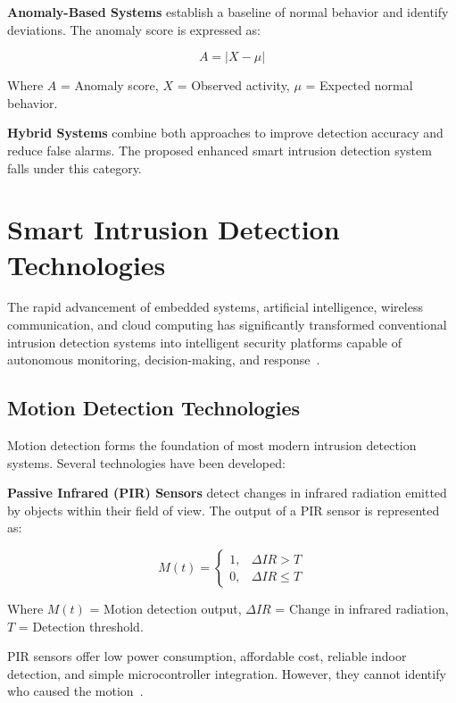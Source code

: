 \documentclass[12pt,a4paper,oneside]{report}
\begin{document}
\textbf{Anomaly-Based Systems} establish a baseline of normal behavior and identify deviations. The anomaly score is expressed as:

\begin{equation}
  A = |X - \mu|
\end{equation}

Where $A$ = Anomaly score, $X$ = Observed activity, $\mu$ = Expected normal behavior.

\textbf{Hybrid Systems} combine both approaches to improve detection accuracy and reduce false alarms. The proposed enhanced smart intrusion detection system falls under this category.

\section{Smart Intrusion Detection Technologies}

The rapid advancement of embedded systems, artificial intelligence, wireless communication, and cloud computing has significantly transformed conventional intrusion detection systems into intelligent security platforms capable of autonomous monitoring, decision-making, and response~\cite{ref4,ref9}.

\subsection{Motion Detection Technologies}

Motion detection forms the foundation of most modern intrusion detection systems. Several technologies have been developed:

\textbf{Passive Infrared (PIR) Sensors} detect changes in infrared radiation emitted by objects within their field of view. The output of a PIR sensor is represented as:

\begin{equation}
  M(t) = \begin{cases} 1, & \Delta IR > T \\ 0, & \Delta IR \leq T \end{cases}
\end{equation}

Where $M(t)$ = Motion detection output, $\Delta IR$ = Change in infrared radiation, $T$ = Detection threshold.

PIR sensors offer low power consumption, affordable cost, reliable indoor detection, and simple microcontroller integration. However, they cannot identify who caused the motion~\cite{ref14,ref18}.
\end{document}
